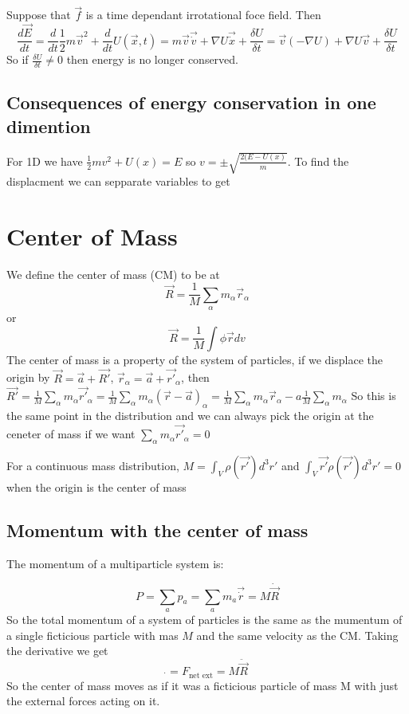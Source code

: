 \documentclass{homework}
\begin{document}
Suppose that $\vec{f}$ is a time dependant irrotational foce field. Then
\[\frac{d\vec{E}}{dt} = \frac{d}{dt}\frac{1}{2}m\vec{v}^2 + \frac{d}{dt}U(\vec{x},t)  = m\vec{v}\vec{\dot{v}} + \nabla U \vec{\dot{x}} + \frac{\delta U}{\delta t} = \vec{v} (-\nabla U) + \nabla U \vec{v} + \frac{\delta U}{\delta t}\]
So if $\frac{\delta U}{\delta t} \neq 0$ then energy is no longer conserved.

\subsection{Consequences of energy conservation in one dimention}
For 1D we have $\frac{1}{2}mv^2 + U(x) = E$ so $v = \pm \sqrt{\frac{2(E-U(x)}{m}}$. To find the displacment we can sepparate variables to get





\section{Center of Mass}

We define the center of mass (CM) to be at
\[\vec{R} = \frac{1}{M}\sum_{\alpha}m_{\alpha}\vec{r}_{\alpha}\]
or
\[\vec{R} = \frac{1}{M} \int \phi \vec{r} dv\]
The center of mass is a property of the system of particles, if we displace the origin by $\vec{R} = \vec{a} + \vec{R'}$, $\vec{r}_{\alpha} = \vec{a} + \vec{r'}_{\alpha}$, then $\vec{R'} = \frac{1}{M}\sum_{\alpha}m_{\alpha}\vec{r'}_{\alpha} = \frac{1}{M}\sum_{\alpha}m_{\alpha}(\vec{r} - \vec{a})_{\alpha} = \frac{1}{M}\sum_{\alpha}m_{\alpha}\vec{r}_{\alpha} -a\frac{1}{M}\sum_{\alpha} m_{\alpha}$
So this is the same point in the distribution and we can always pick the origin at the ceneter of mass if we want $\sum_{\alpha}m_{\alpha}\vec{r'}_{\alpha} = 0$


For a continuous mass distribution, $M = \int_{V} \rho(\vec{r'})d^3r'$ and $ \int_{V} \vec{r'}\rho(\vec{r'})d^3r' = 0$ when the origin is the center of mass

\subsection{Momentum with the center of mass}

The momentum of a multiparticle system is:

\[P = \sum_{a}p_a =\sum_{a}m_a\vec{\dot{r}} = M\dot{\vec{R}} \]
So the total momentum of a system of particles is the same as the mumentum of a single ficticious particle with mas $M$ and the same velocity as the CM. Taking the derivative we get
\[\dot{} = F_{\text{net ext}} = M\ddot{\vec{R}} \]
So the center of mass moves as if it was a ficticious particle of mass M with just the external forces acting on it.
\end{document}
